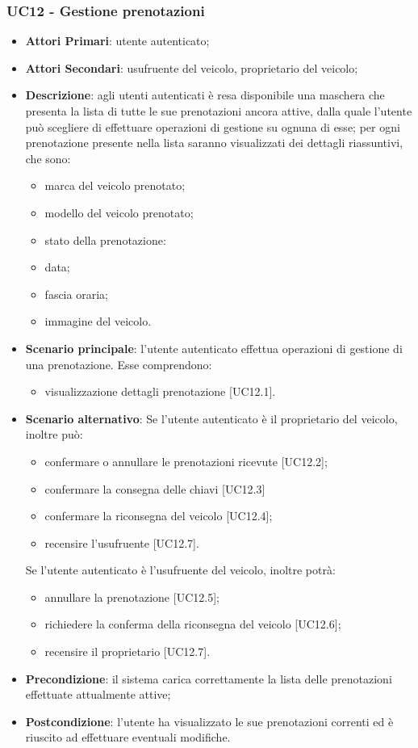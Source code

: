 \subsubsection{UC12 - Gestione prenotazioni}
\begin{itemize}
	\item \textbf{Attori Primari}: utente autenticato;
	\item \textbf{Attori Secondari}:
	usufruente del veicolo, proprietario del veicolo;
	\item \textbf{Descrizione}: agli utenti autenticati è resa disponibile una maschera che presenta la lista di tutte le sue prenotazioni ancora attive, dalla quale l'utente può scegliere di effettuare operazioni di gestione su ognuna di esse;
	per ogni prenotazione presente nella lista saranno visualizzati dei dettagli riassuntivi, che sono:
	\begin{itemize}
		\item marca del veicolo prenotato;
		\item modello del veicolo prenotato;
		\item stato della prenotazione:
		\item data;
		\item fascia oraria;
		\item immagine del veicolo.
	\end{itemize}
	\item \textbf{Scenario principale}: l'utente autenticato effettua operazioni di gestione di una prenotazione. Esse comprendono:
	\begin{itemize}
		\item visualizzazione dettagli prenotazione [UC12.1].
	\end{itemize}
	\item \textbf{Scenario alternativo}: Se l'utente autenticato è il proprietario del veicolo, inoltre può:
	\begin{itemize}
		\item confermare o annullare le prenotazioni ricevute [UC12.2];
		\item confermare la consegna delle chiavi [UC12.3]
		\item confermare la riconsegna del veicolo [UC12.4];
		\item recensire l'usufruente [UC12.7].
	\end{itemize}
	Se l'utente autenticato è l'usufruente del veicolo, inoltre potrà:
	\begin{itemize}
		\item annullare la prenotazione [UC12.5];
		\item richiedere la conferma della riconsegna del veicolo [UC12.6];
		\item recensire il proprietario [UC12.7].
	\end{itemize}
	\item \textbf{Precondizione}: il sistema carica correttamente la lista delle prenotazioni effettuate attualmente attive;
	\item \textbf{Postcondizione}: l'utente ha visualizzato le sue prenotazioni correnti ed è riuscito ad effettuare eventuali modifiche.
\end{itemize} 
